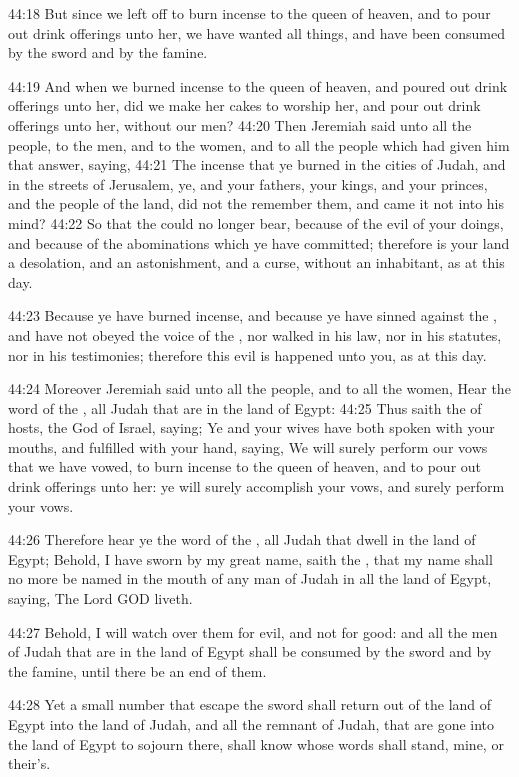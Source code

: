 44:18 But since we left off to burn incense to the queen of heaven,
and to pour out drink offerings unto her, we have wanted all things,
and have been consumed by the sword and by the famine.

44:19 And when we burned incense to the queen of heaven, and poured
out drink offerings unto her, did we make her cakes to worship her,
and pour out drink offerings unto her, without our men?  44:20 Then
Jeremiah said unto all the people, to the men, and to the women, and
to all the people which had given him that answer, saying, 44:21 The
incense that ye burned in the cities of Judah, and in the streets of
Jerusalem, ye, and your fathers, your kings, and your princes, and the
people of the land, did not the \LORD remember them, and came it not
into his mind?  44:22 So that the \LORD could no longer bear, because
of the evil of your doings, and because of the abominations which ye
have committed; therefore is your land a desolation, and an
astonishment, and a curse, without an inhabitant, as at this day.

44:23 Because ye have burned incense, and because ye have sinned
against the \LORD, and have not obeyed the voice of the \LORD, nor
walked in his law, nor in his statutes, nor in his testimonies;
therefore this evil is happened unto you, as at this day.

44:24 Moreover Jeremiah said unto all the people, and to all the
women, Hear the word of the \LORD, all Judah that are in the land of
Egypt: 44:25 Thus saith the \LORD of hosts, the God of Israel, saying;
Ye and your wives have both spoken with your mouths, and fulfilled
with your hand, saying, We will surely perform our vows that we have
vowed, to burn incense to the queen of heaven, and to pour out drink
offerings unto her: ye will surely accomplish your vows, and surely
perform your vows.

44:26 Therefore hear ye the word of the \LORD, all Judah that dwell in
the land of Egypt; Behold, I have sworn by my great name, saith the
\LORD, that my name shall no more be named in the mouth of any man of
Judah in all the land of Egypt, saying, The Lord GOD liveth.

44:27 Behold, I will watch over them for evil, and not for good: and
all the men of Judah that are in the land of Egypt shall be consumed
by the sword and by the famine, until there be an end of them.

44:28 Yet a small number that escape the sword shall return out of the
land of Egypt into the land of Judah, and all the remnant of Judah,
that are gone into the land of Egypt to sojourn there, shall know
whose words shall stand, mine, or their's.

